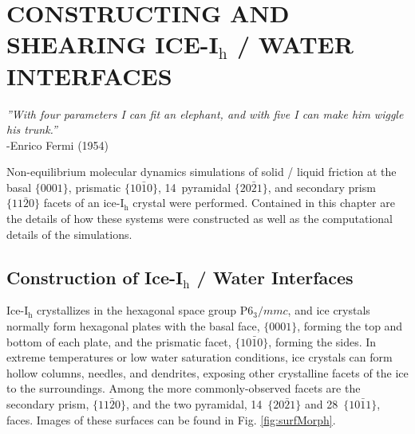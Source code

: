 

\chapter{CONSTRUCTING AND SHEARING ICE-I$_\mathrm{h}$ / WATER INTERFACES}\label{chap:Methods}

\begin{flushright}
\textit{''With four parameters I can fit an elephant, and with five I
  can make him wiggle his trunk.''} \\
-Enrico Fermi (1954) \\
\end{flushright}


Non-equilibrium molecular dynamics simulations of solid / liquid
friction at the basal $\{0001\}$, prismatic $\{10\bar{1}0\}$,
14\degree~pyramidal $\{20\bar{2}1\}$, and secondary prism
$\{11\bar{2}0\}$ facets of an ice-I$_\mathrm{h}$ crystal were
performed. Contained in this chapter are the details of how these
systems were constructed as well as the computational details
of the simulations. 


\section{Construction of Ice-I$_\mathrm{h}$ / Water Interfaces}

Ice-I$_\mathrm{h}$ crystallizes in the hexagonal space group
P$6_3/mmc$, and ice crystals normally form hexagonal plates with the
basal face, $\{0001\}$, forming the top and bottom of each plate, and
the prismatic facet, $\{10\bar{1}0\}$, forming the sides.  In extreme
temperatures or low water saturation conditions, ice crystals can form
hollow columns, needles, and dendrites, exposing other crystalline
facets of the ice to the surroundings.  Among the more
commonly-observed facets are the secondary prism, $\{11\bar{2}0\}$,
and the two pyramidal, 14\degree~$\{20\bar{2}1\}$ and
28\degree~$\{10\bar{1}1\}$, faces. Images of these surfaces can
be found in Fig. \ref{fig:surfMorph}.


